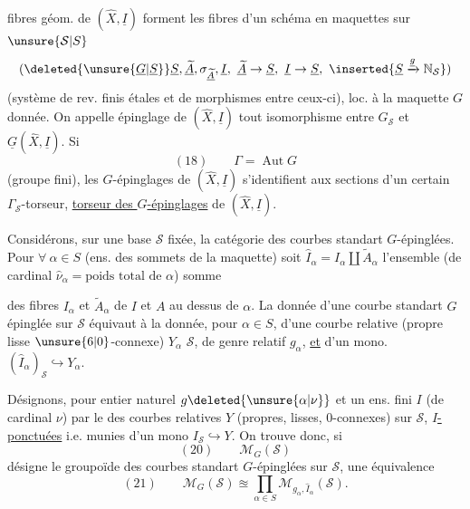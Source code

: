 fibres géom. de $(\widehat X,\underline I)$ forment les fibres d'un schéma en maquettes  sur $\unsure{\mathcal S|S}$
\[
(\deleted{\unsure{\underline G|\underline S}}\underline S,\underline{\widetilde A},\sigma_{\underline{\widetilde A}},\underline I,\ \underline{\widetilde A}\to\underline S,\ \underline I\to\underline S,\ \inserted{\underline S\xrightarrow{\underline g}\mathbb N_{\mathcal S}})
\]
(système de rev. finis étales  et de morphismes entre ceux-ci), loc.  à la maquette $G$ donnée.  On appelle épinglage de $(\widehat X,\underline I)$ tout isomorphisme entre $G_{\mathcal S}$ et $\underline G(\widehat X,\underline I)$. Si \deleted{$\Gamma$}
\[
(18)\qquad\Gamma=\operatorname{Aut}G
\]
(groupe fini), les $G$-épinglages de $(\widehat X,\underline I)$ s'identifient aux sections d'un certain $\Gamma_{\mathcal S}$-torseur,  \uline{torseur des $G$-épinglages} de $(\widehat X,\underline I)$.

Considérons, sur une base $\mathcal S$ fixée, la catégorie  des courbes standart $G$-épinglées. Pour $\forall\ \alpha\in S$ (ens. des sommets de la maquette) soit $\widehat I_\alpha=I_\alpha\amalg\widetilde A_\alpha$ l'ensemble (de cardinal $\widehat\nu_\alpha=\text{poids total de }\alpha$) somme

des fibres $I_\alpha$ et $\widetilde A_\alpha$ de $I$ et $A$ au dessus de $\alpha$. La donnée d'une courbe standart $G$ épinglée sur $\mathcal S$ équivaut à la donnée,  pour  $\alpha\in S$, d'une courbe relative (propre lisse  $\unsure{6|0}$-connexe) $Y_\alpha$  $\mathcal S$, de genre relatif $g_\alpha$, \uline{et} d'un mono. $(\widehat I_\alpha)_{\mathcal S}\hookrightarrow Y_\alpha$.

Désignons,  pour  entier naturel $g\deleted{\unsure{\alpha|\nu}}$ et un ens. fini $I$ (de cardinal $\nu$) par
le  des courbes relatives $Y$ (propres, lisses, $0$-connexes) sur $\mathcal S$, \uline{$I$-ponctuées} i.e. munies d'un mono $I_{\mathcal S}\hookrightarrow Y$. On trouve donc, si
\[
(20)\qquad\mathcal M_G(\mathcal S)
\]
désigne le groupoïde des courbes standart $G$-épinglées sur $\mathcal S$, une équivalence
\[
(21)\qquad\mathcal M_G(\mathcal S)\approxeq\prod_{\alpha\in S}\mathcal M_{g_\alpha,\widehat I_\alpha}(\mathcal S).
\]


